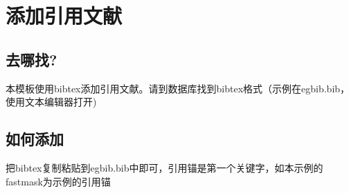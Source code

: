 \chapter{添加引用文献}\label{chap4}

\section{去哪找?}

本模板使用bibtex添加引用文献。请到数据库找到bibtex格式（示例在egbib.bib，使用文本编辑器打开)

\section{如何添加}
把bibtex复制粘贴到egbib.bib中即可，引用锚是第一个关键字，如本示例的fastmask为示例的引用锚
